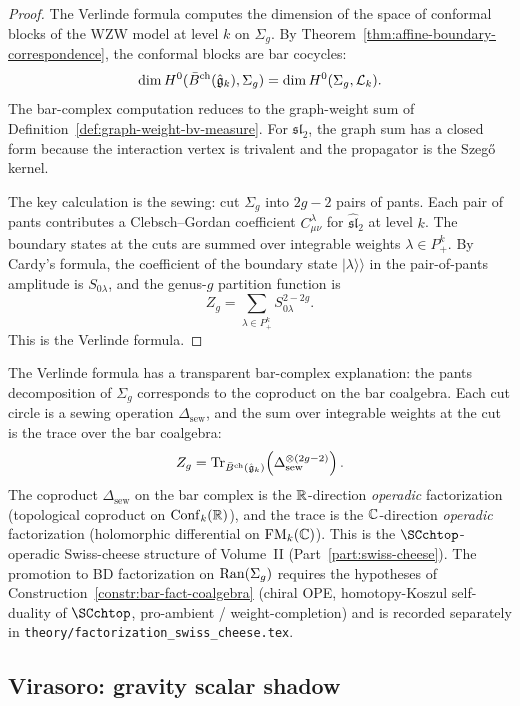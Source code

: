 \begin{proof}
The Verlinde formula computes the dimension of the space of conformal
blocks of the WZW model at level $k$ on $\Sigma_g$. By
Theorem~\ref{thm:affine-boundary-correspondence}, the conformal blocks
are bar cocycles:
\[
\dim H^0(\bar{B}^{\mathrm{ch}}(\hat{\mathfrak{g}}_k), \Sigma_g)
 = \dim H^0(\Sigma_g, \mathcal{L}_k).
\]
The bar-complex computation reduces to the graph-weight sum of
Definition~\ref{def:graph-weight-bv-measure}. For $\mathfrak{sl}_2$,
the graph sum has a closed form because the interaction vertex is
trivalent and the propagator is the Szeg\H{o} kernel.

The key calculation is the sewing: cut $\Sigma_g$ into $2g-2$ pairs of
pants. Each pair of pants contributes a Clebsch--Gordan coefficient
$C^\lambda_{\mu\nu}$ for $\widehat{\mathfrak{sl}}_2$ at level $k$.
The boundary states at the cuts are summed over integrable weights
$\lambda \in P^k_+$. By Cardy's formula, the coefficient of the
boundary state $|\lambda\rangle\!\rangle$ in the pair-of-pants amplitude
is $S_{0\lambda}$, and the genus-$g$ partition function is
\[
Z_g = \sum_{\lambda \in P^k_+} S_{0\lambda}^{2-2g}.
\]
This is the Verlinde formula.
\end{proof}

\begin{remark}
The Verlinde formula has a transparent bar-complex explanation: the
pants decomposition of $\Sigma_g$ corresponds to the coproduct on the
bar coalgebra. Each cut circle is a sewing operation
$\Delta_{\mathrm{sew}}$, and the sum over integrable weights at the cut
is the trace over the bar coalgebra:
\[
Z_g = \operatorname{Tr}_{\bar{B}^{\mathrm{ch}}(\hat{\mathfrak{g}}_k)}\!\left(
 \Delta_{\mathrm{sew}}^{\otimes (2g-2)}
\right).
\]
The coproduct $\Delta_{\mathrm{sew}}$ on the bar complex is the
$\mathbb{R}$-direction \emph{operadic} factorization (topological
coproduct on $\operatorname{Conf}_k(\mathbb{R})$), and the trace is the
$\mathbb{C}$-direction \emph{operadic} factorization (holomorphic
differential on $\operatorname{FM}_k(\mathbb{C})$). This is the $\SCchtop$-operadic
Swiss-cheese structure of Volume~II
(Part~\ref{part:swiss-cheese}). The promotion to BD
factorization on $\operatorname{Ran}(\Sigma_g)$ requires the hypotheses of
Construction~\ref{constr:bar-fact-coalgebra}
\textup{(}chiral OPE, homotopy-Koszul self-duality of
$\SCchtop$, pro-ambient / weight-completion\textup{)} and is
recorded separately in
\texttt{theory/factorization\_swiss\_cheese.tex}.
\end{remark}

\subsection{Virasoro: gravity scalar shadow}

